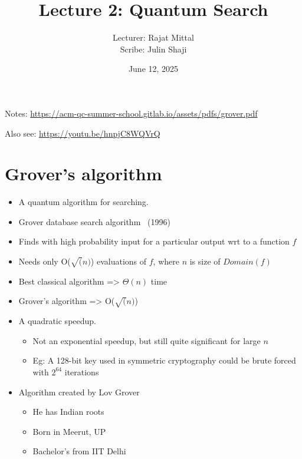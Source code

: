 \documentclass[12pt]{article}
\begin{document}
\title{Lecture 2: Quantum Search}
\author{Lecturer: Rajat Mittal\\ Scribe: Julin Shaji}
\date{June 12, 2025}
\maketitle

Notes: \url{https://acm-qc-summer-school.gitlab.io/assets/pdfs/grover.pdf}

Also see: \url{https://youtu.be/hnpjC8WQVrQ}

\section{Grover's algorithm}
\begin{itemize}
\item A quantum algorithm for searching.
\item Grover database search algorithm~\cite{grover1996fast} (1996)
\item
  Finds with high probability input for a particular output wrt to
  a function $f$
\item
  Needs only O($\sqrt(n)$) evaluations of $f$, where $n$ is size
  of $Domain(f)$
\item Best classical algorithm => $\Theta(n)$ time
\item Grover's algorithm => O($\sqrt(n)$)
\item A quadratic speedup.
  \begin{itemize}
  \item
    Not an exponential speedup, but still quite significant for
    large $n$
  \item
    Eg: A 128-bit key used in symmetric cryptography could be
    brute forced with $2^{64}$ iterations 
  \end{itemize}
\item Algorithm created by Lov Grover
  \begin{itemize}
  \item He has Indian roots
  \item Born in Meerut, UP
  \item Bachelor's from IIT Delhi
  \end{itemize}
\end{itemize}
\end{document}
